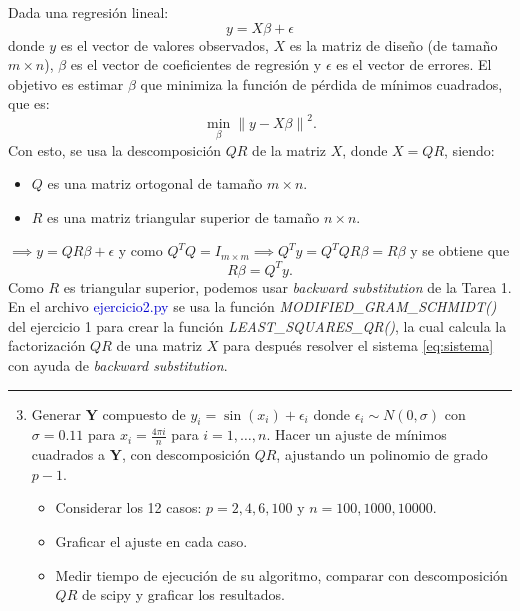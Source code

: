 Dada una regresión lineal:
\begin{equation}
	y = X\beta+\epsilon
\end{equation}
donde $y$ es el vector de valores observados, $X$ es la matriz de diseño (de tamaño $m\times n$), $\beta$ es el vector de coeficientes de regresión y $\epsilon$ es el vector de errores. El objetivo es estimar $\beta$ que minimiza la función de pérdida de mínimos cuadrados, que es:
\begin{equation}
	\min_{\beta} \left\| y-X\beta \right\|^2.
\end{equation}
Con esto, se usa la descomposición $QR$ de la matriz $X$, donde $X = QR$, siendo:
\begin{itemize}
	\item $Q$ es una matriz ortogonal de tamaño $m\times n$.
	\item $R$ es una matriz triangular superior de tamaño $n \times n$.
\end{itemize}
$\implies y = QR\beta + \epsilon$ y como $ Q^{T}Q = I_{m\times m}\implies Q^{T}y = Q^{T}QR\beta = R\beta$ y se obtiene que
\begin{equation} \label{eq:sistema}
	R\beta = Q^{T}y.
\end{equation}
Como $R$ es triangular superior, podemos usar {\it backward substitution} de la Tarea 1. En el archivo \textcolor{mediumblue}{ejercicio2.py} se usa la función \textit{MODIFIED\_GRAM\_SCHMIDT()} del ejercicio 1 para crear la función \textit{LEAST\_SQUARES\_QR()}, la cual calcula la factorización $QR$ de una matriz $X$ para después resolver el sistema \eqref{eq:sistema} con ayuda de {\it backward substitution}.

\vspace{6mm}
{\color{lightgray} \hrule}
\begin{enumerate} \setcounter{enumi}{2}
	\item Generar $\mathbf{Y}$ compuesto de $y_i=\sin{\left(x_i\right)}+\epsilon_i$ donde $\epsilon_i \sim N(0, \sigma)$ con $\sigma=0.11$ para $x_i=\frac{4 \pi i}{n}$ para $i=1, \ldots, n$. Hacer un ajuste de mínimos cuadrados a $\mathbf{Y}$, con descomposición $Q R$, ajustando un polinomio de grado $p-1$.
	\begin{itemize}
		\item Considerar los 12 casos: $p=2,4,6,100$ y $n=100,1000,10000$.
		\item Graficar el ajuste en cada caso.
		\item Medir tiempo de ejecución de su algoritmo, comparar con descomposición $Q R$ de scipy y graficar los resultados.
	\end{itemize}
\end{enumerate}

